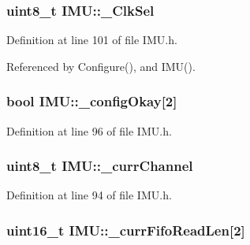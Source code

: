 \hypertarget{class_i_m_u_a4dbeaf17fd1ae9b41b5c3fe61706e5f1}{
\subsubsection[{\_\-ClkSel}]{\setlength{\rightskip}{0pt plus 5cm}uint8\_\-t {\bf IMU::\_\-ClkSel}}}
\label{class_i_m_u_a4dbeaf17fd1ae9b41b5c3fe61706e5f1}


Definition at line 101 of file IMU.h.



Referenced by Configure(), and IMU().

\hypertarget{class_i_m_u_a53aa928d2d68a5287da893bd157e7cbe}{
\subsubsection[{\_\-configOkay}]{\setlength{\rightskip}{0pt plus 5cm}bool {\bf IMU::\_\-configOkay}\mbox{[}2\mbox{]}}}
\label{class_i_m_u_a53aa928d2d68a5287da893bd157e7cbe}


Definition at line 96 of file IMU.h.

\hypertarget{class_i_m_u_a08a36cacd3d4d14b4aa834a657422b15}{
\subsubsection[{\_\-currChannel}]{\setlength{\rightskip}{0pt plus 5cm}uint8\_\-t {\bf IMU::\_\-currChannel}}}
\label{class_i_m_u_a08a36cacd3d4d14b4aa834a657422b15}


Definition at line 94 of file IMU.h.

\hypertarget{class_i_m_u_aa9a352174cae0cd174cb91ef09a47fe4}{
\subsubsection[{\_\-currFifoReadLen}]{\setlength{\rightskip}{0pt plus 5cm}uint16\_\-t {\bf IMU::\_\-currFifoReadLen}\mbox{[}2\mbox{]}}}
\label{class_i_m_u_aa9a352174cae0cd174cb91ef09a47fe4}


